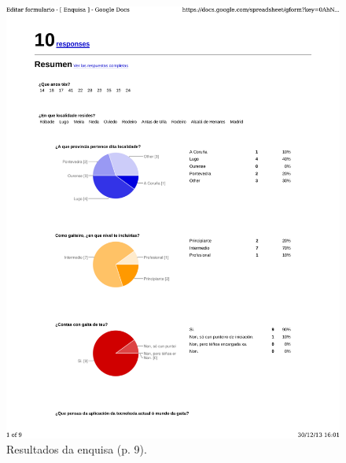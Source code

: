 \begin{figure}
 \centering
 \includegraphics[scale=0.7,page=9,keepaspectratio=true,clip,trim=0cm 22cm 0cm 0cm]{./imagenes/enquisa.pdf}
 \caption{Resultados da enquisa (p. 9).}
 \label{figura:ResultadosEnquisa9}
\end{figure}